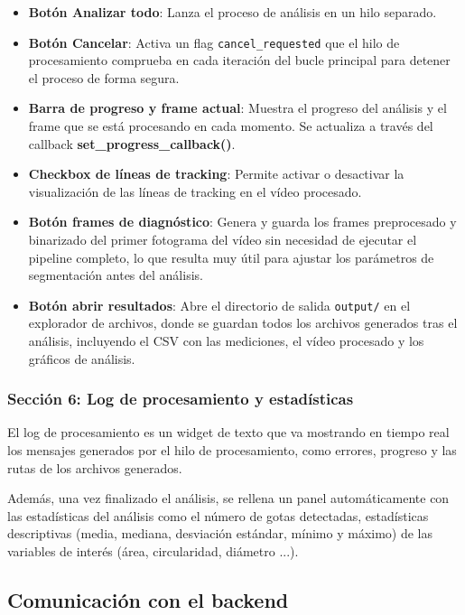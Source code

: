 \begin{itemize}
    \item \textbf{Botón Analizar todo}: Lanza el proceso de análisis en un hilo separado.
    \item \textbf{Botón Cancelar}: Activa un flag \texttt{cancel\_requested} que el hilo de procesamiento comprueba en cada iteración del bucle principal para detener el proceso de forma segura.
    \item \textbf{Barra de progreso y frame actual}: Muestra el progreso del análisis y el frame que se está procesando en cada momento. Se actualiza a través del callback \textbf{set\_progress\_callback()}.
    \item \textbf{Checkbox de líneas de tracking}: Permite activar o desactivar la visualización de las líneas de tracking en el vídeo procesado.
    \item \textbf{Botón frames de diagnóstico}: Genera y guarda los frames preprocesado y binarizado del primer fotograma del vídeo sin necesidad de ejecutar el pipeline completo, lo que resulta muy útil para ajustar los parámetros de segmentación antes del análisis.
    \item \textbf{Botón abrir resultados}: Abre el directorio de salida \texttt{output/} en el explorador de archivos, donde se guardan todos los archivos generados tras el análisis, incluyendo el CSV con las mediciones, el vídeo procesado y los gráficos de análisis.
\end{itemize}

\subsubsection{Sección 6: Log de procesamiento y estadísticas}

El log de procesamiento es un widget de texto que va mostrando en tiempo real los mensajes generados por el hilo de procesamiento, como errores, progreso y las rutas de los archivos generados.

Además, una vez finalizado el análisis, se rellena un panel automáticamente con las estadísticas del análisis como el número de gotas detectadas, estadísticas descriptivas (media, mediana, desviación estándar, mínimo y máximo) de las variables de interés (área, circularidad, diámetro ...).

\subsection{Comunicación con el backend}

